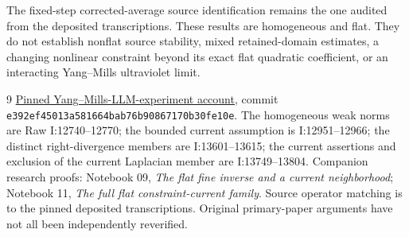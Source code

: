\documentclass[11pt]{article}
\theoremstyle{remark}
\begin{document}
The fixed-step corrected-average source identification remains the
one audited from the deposited transcriptions. These results are
homogeneous and flat. They do not establish nonflat source stability,
mixed retained-domain estimates, a changing nonlinear constraint
beyond its exact flat quadratic coefficient, or an interacting
Yang--Mills ultraviolet limit.

\begin{thebibliography}{9}
\href{https://github.com/ethanwsussman/Yang--Mills-LLM-experiment/tree/e392ef45013a581664bab76b90867170b30fe10e}
{Pinned Yang--Mills-LLM-experiment account}, commit
\texttt{e392ef45013a581664bab76b90867170b30fe10e}.
The homogeneous weak norms are Raw I:12740--12770; the bounded
current assumption is I:12951--12966; the distinct right-divergence
members are I:13601--13615; the current assertions and exclusion of
the current Laplacian member are I:13749--13804.
Companion research proofs: Notebook 09, \emph{The flat fine inverse
and a current neighborhood}; Notebook 11, \emph{The full flat
constraint-current family}. Source operator matching is to the pinned
deposited transcriptions. Original primary-paper arguments have not
all been independently reverified.
\end{thebibliography}
\end{document}
